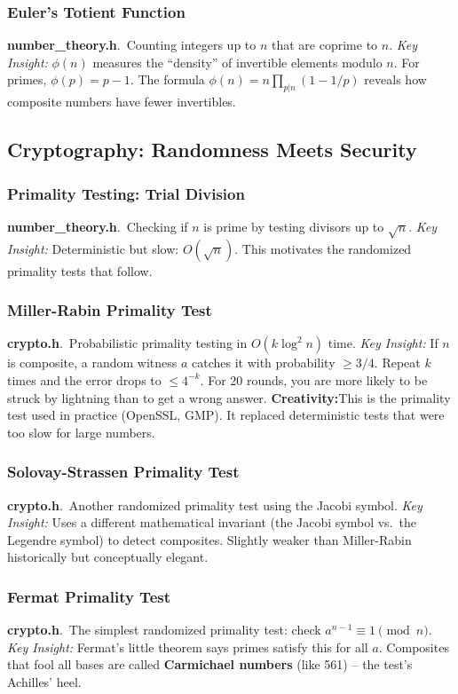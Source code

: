 \documentclass[11pt,a4paper]{article}
\newcommand{\algo}[2]{\textbf{#1}.\ #2}
\newcommand{\insight}{\textit{Key Insight: }}
\newcommand{\creative}{\textcolor{orange!80!black}{\textbf{Creativity:}}}
\begin{document}
\subsubsection{Euler's Totient Function}
\algo{number\_theory.h}{Counting integers up to \(n\) that are coprime to \(n\).}
\insight \(\phi(n)\) measures the ``density'' of invertible elements modulo \(n\). For primes, \(\phi(p) = p-1\). The formula \(\phi(n) = n \prod_{p|n}(1 - 1/p)\) reveals how composite numbers have fewer invertibles.

\subsection{Cryptography: Randomness Meets Security}

\subsubsection{Primality Testing: Trial Division}
\algo{number\_theory.h}{Checking if \(n\) is prime by testing divisors up to \(\sqrt{n}\).}
\insight Deterministic but slow: \(O(\sqrt{n})\). This motivates the randomized primality tests that follow.

\subsubsection{Miller-Rabin Primality Test}
\algo{crypto.h}{Probabilistic primality testing in \(O(k \log^2 n)\) time.}
\insight If \(n\) is composite, a random witness \(a\) catches it with probability \(\ge 3/4\). Repeat \(k\) times and the error drops to \(\le 4^{-k}\). For 20 rounds, you are more likely to be struck by lightning than to get a wrong answer.
\creative This is the primality test used in practice (OpenSSL, GMP). It replaced deterministic tests that were too slow for large numbers.

\subsubsection{Solovay-Strassen Primality Test}
\algo{crypto.h}{Another randomized primality test using the Jacobi symbol.}
\insight Uses a different mathematical invariant (the Jacobi symbol vs.\ the Legendre symbol) to detect composites. Slightly weaker than Miller-Rabin historically but conceptually elegant.

\subsubsection{Fermat Primality Test}
\algo{crypto.h}{The simplest randomized primality test: check \(a^{n-1} \equiv 1 \pmod{n}\).}
\insight Fermat's little theorem says primes satisfy this for all \(a\). Composites that fool all bases are called \textbf{Carmichael numbers} (like 561) -- the test's Achilles' heel.
\end{document}
